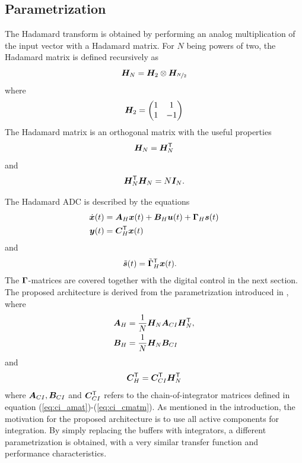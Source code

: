 \subsection{Parametrization}
The Hadamard transform is obtained by performing an analog multiplication of the input vector with a Hadamard matrix. For $N$ being powers of two, the Hadamard matrix is defined recursively as
\begin{equation}
    \label{eq:defn}
    \bm{H_}{N} = \bm{H_}{2} \otimes \bm{H_}{\nicefrac{N}{2}}
\end{equation}
where
\begin{equation}
    \label{eq:def2}
    \bm{H_}{2} =
    \begin{pmatrix}
    1 & 1 \\
    1 & -1
    \end{pmatrix}
\end{equation}
The Hadamard matrix is an orthogonal matrix with the useful properties
\begin{equation}
    \label{eq:Hmat_symmetry}
    \bm{H_}{N} = \bm{H_}{N}^\mathsf{T}
\end{equation}
and
\begin{equation}
    \label{eq:Hmat_inverse}
    \bm{H_}{N}^\mathsf{T}\bm{H_}{N} = N\bm{I}_{N}.
\end{equation}

The Hadamard ADC is described by the equations
\begin{align}
    \label{eq:hci_state_space_equations}
    \dot{\bm{x}}(t) & = \bm{A}_H \bm{x}(t) + \bm{B}_H \bm{u}(t) + \bm{\Gamma}_H \bm{s}(t) \\
    \bm{y}(t) & = \bm{C}^\mathsf{T}_H \bm{x}(t)
\end{align}
and
\begin{align}
    \tilde{\bm{s}}(t) & = \tilde{\bm{\Gamma}}^\mathsf{T}_H \bm{x}(t).
\end{align}
The $\bm{\Gamma}$-matrices are covered together with the digital control in the next section. The proposed architecture is derived from the parametrization introduced in \cite{malmberg_thesis}, where
\begin{align}
    \bm{A}_H & = \frac{1}{N} \bm{H}_N \bm{A}_{CI} \bm{H}_N^\mathsf{T} \label{eq:AH_hampus}, \\
    \bm{B}_H & = \frac{1}{N} \bm{H}_N \bm{B}_{CI} \label{eq:BH_hampus}
\end{align}
and
\begin{equation}
    \label{eq:CH_hampus}
    \bm{C}^\mathsf{T}_H = \bm{C}^\mathsf{T}_{CI} \bm{H}_N^\mathsf{T}
\end{equation}
where $\bm{A}_{CI}, \bm{B}_{CI}$ and $\bm{C}^\mathsf{T}_{CI}$ refers to the chain-of-integrator matrices defined in equation (\ref{eq:ci_amat})-(\ref{eq:ci_cmatm}). As mentioned in the introduction, the motivation for the proposed architecture is to use all active components for integration. By simply replacing the buffers with integrators, a different parametrization is obtained, with a very similar transfer function and performance characteristics.

